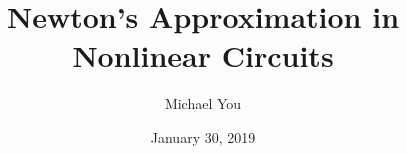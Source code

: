 \usepackage[margin=1in]{geometry}
\usepackage{amsmath, amsthm, amssymb}
\usepackage[arrowmos, american voltages]{circuitikz}
\usepackage{enumitem}
\usepackage{fancyhdr} %
\usepackage{float}
\usepackage{fancyhdr}
\usepackage{graphicx}
\usepackage{hyperref} %
\usepackage{lastpage} %
\usepackage{mathtools}
\usepackage[super]{nth}
\usepackage{physics}
\usepackage{siunitx} %
\usepackage{tikz}
\usepackage{verbatim}

\usepackage{listings, lstautogobble}
\usepackage{color}
\usepackage[T1]{fontenc}

\setlength\parindent{0pt}

\title{Newton's Approximation in Nonlinear Circuits}
\author{Michael You}
\date{January 30, 2019}

\fancyhf{}
\rhead{}
\fancyfoot[C]{\thepage}

\theoremstyle{definition}
\newtheorem{definition}{Definition}

\DeclarePairedDelimiter{\ceil}{\lceil}{\rceil}
\DeclarePairedDelimiter{\floor}{\lfloor}{\rfloor}
\DeclarePairedDelimiter{\paren}{(}{)}
\DeclarePairedDelimiter{\bracken}{[}{]}
\DeclarePairedDelimiter{\bracens}{\{}{\}}
\newcommand{\pa}[1]{\paren*{#1}}
\newcommand{\pbra}[1]{\bracken*{#1}}
\newcommand{\pbrc}[1]{\bracens*{#1}}
\newcommand{\db}[1]{\llbracket{#1}\rrbracket}
\newcommand{\bangle}[1]{\left\langle #1 \right\rangle}

\newcommand{\te}[1]{\texttt{#1}} %
\newcommand{\eq}{=}
\newcommand{\ps}{\mathbin{\|}} %

\newcommand{\VG}{V_\text{G}}
\newcommand{\VS}{V_\text{S}}
\newcommand{\VD}{V_\text{D}}
\newcommand{\VGS}{V_\text{GS}}
\newcommand{\VDS}{V_\text{DS}}
\newcommand{\VTH}{V_\text{TH}}
\newcommand{\VDD}{V_\text{DD}}

\newcommand{\VI}{V_\text{IN}}
\newcommand{\VIN}{V_\text{IN}}
\newcommand{\VO}{V_\text{OUT}}
\newcommand{\VOUT}{V_\text{OUT}}
\newcommand{\VDZ}{v_{\text{D}_0}}
\newcommand{\vt}{v_\text{T}}
\newcommand{\id}{i_\text{D}}
\newcommand{\vd}{v_\text{D}}


